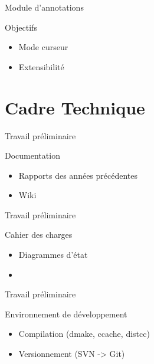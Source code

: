 \documentclass{beamer}
\begin{document}
\begin{frame}{Module d'annotations}
    \begin{block}{Objectifs}
        \begin{itemize}[<+->]
            \item Mode curseur
            \item Extensibilité
        \end{itemize}
    \end{block}
\end{frame}

\section{Cadre Technique}

\begin{frame}{Travail préliminaire}
    \begin{block}{Documentation}
        \begin{itemize}[<+->]
            \item Rapports des années précédentes
            \item Wiki
        \end{itemize}
    \end{block}
\end{frame}

\begin{frame}{Travail préliminaire}
    \begin{block}{Cahier des charges}
        \begin{itemize}[<+->]
            \item Diagrammes d'état
            \item 
        \end{itemize}
    \end{block}
\end{frame}

\begin{frame}{Travail préliminaire}
    \begin{block}{Environnement de développement}
        \begin{itemize}[<+->]
            \item Compilation (dmake, ccache, distcc)
            \item Versionnement (SVN -> Git)
        \end{itemize}
    \end{block}
\end{frame}
\end{document}
